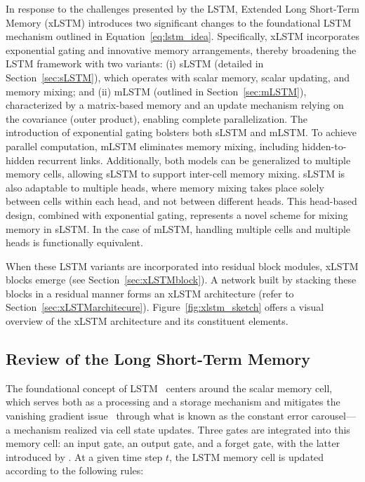 In response to the challenges presented by the LSTM, Extended Long Short-Term Memory (xLSTM) introduces two significant changes to the foundational LSTM mechanism outlined in Equation~\eqref{eq:lstm_idea}. Specifically, xLSTM incorporates exponential gating and innovative memory arrangements, thereby broadening the LSTM framework with two variants: (i) sLSTM (detailed in Section~\ref{sec:sLSTM}), which operates with scalar memory, scalar updating, and memory mixing; and (ii) mLSTM (outlined in Section~\ref{sec:mLSTM}), characterized by a matrix-based memory and an update mechanism relying on the covariance (outer product), enabling complete parallelization. The introduction of exponential gating bolsters both sLSTM and mLSTM. To achieve parallel computation, mLSTM eliminates memory mixing, including hidden-to-hidden recurrent links. Additionally, both models can be generalized to multiple memory cells, allowing sLSTM to support inter-cell memory mixing. sLSTM is also adaptable to multiple heads, where memory mixing takes place solely between cells within each head, and not between different heads. This head-based design, combined with exponential gating, represents a novel scheme for mixing memory in sLSTM. In the case of mLSTM, handling multiple cells and multiple heads is functionally equivalent.

When these LSTM variants are incorporated into residual block modules, xLSTM blocks emerge (see Section~\ref{sec:xLSTMblock}). A network built by stacking these blocks in a residual manner forms an xLSTM architecture (refer to Section~\ref{sec:xLSTMarchitecure}). Figure~\ref{fig:xlstm_sketch} offers a visual overview of the xLSTM architecture and its constituent elements.

\subsection{Review of the Long Short-Term Memory}
\label{sec:orgLSTM}

The foundational concept of LSTM~\citep{Hochreiter:91,Hochreiter:97nips,Hochreiter:97} centers around the scalar memory cell, which serves both as a processing and a storage mechanism and mitigates the vanishing gradient issue~\citep{Hochreiter:91,Hochreiter:00book} through what is known as the constant error carousel—a mechanism realized via cell state updates. Three gates are integrated into this memory cell: an input gate, an output gate, and a forget gate, with the latter introduced by \citet{Gers:00}. 
At a given time step $t$, the LSTM memory cell is updated according to the following rules:

